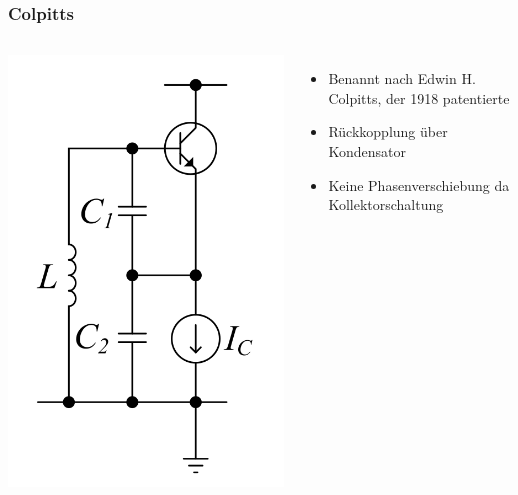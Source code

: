 \begin{frame}
  \frametitle{Colpitts}
  \begin{columns}
    \begin{center}
      \includegraphics[width=\textwidth,height=.85\textheight,keepaspectratio]{a07/Cc_colp2.png} \\[1em]
    \end{center}
    \begin{itemize}
      \item Benannt nach Edwin H. Colpitts, der 1918 patentierte
      \item Rückkopplung über Kondensator
      \item Keine Phasenverschiebung da Kollektorschaltung
    \end{itemize}
  \end{columns}
\end{frame}

